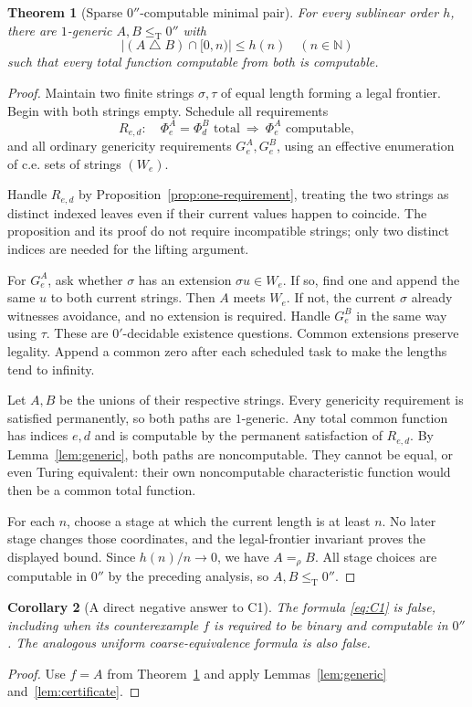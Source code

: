 \documentclass[11pt,a4paper]{article}
\newcommand{\N}{\mathbb N}
\newcommand{\leT}{\leq_{\mathrm T}}
\newtheorem{theorem}{Theorem}[section]
\newtheorem{corollary}[theorem]{Corollary}
\theoremstyle{definition}\newtheorem{definition}[theorem]{Definition}
\theoremstyle{remark}\newtheorem{remark}[theorem]{Remark}
\begin{document}
\begin{theorem}[Sparse $0''$-computable minimal pair]\label{thm:pair}
For every sublinear order $h$, there are $1$-generic $A,B\leT0''$ with
\[
 |(A\mathbin\triangle B)\cap[0,n)|\le h(n)\quad(n\in\N)
\]
such that every total function computable from both is computable.
\end{theorem}
\begin{proof}
Maintain two finite strings $\sigma,\tau$ of equal length forming a legal
frontier. Begin with both strings empty. Schedule all requirements
\[
 R_{e,d}:\quad\Phi_e^A=\Phi_d^B\text{ total}
                       \ \Longrightarrow\ \Phi_e^A\text{ computable},
\]
and all ordinary genericity requirements $G_e^A,G_e^B$, using an effective
enumeration of c.e. sets of strings $(W_e)$.

Handle $R_{e,d}$ by Proposition~\ref{prop:one-requirement}, treating the two
strings as distinct indexed leaves even if their current values happen to
coincide. The proposition and its proof do not require incompatible strings;
only two distinct indices are needed for the lifting argument.

For $G_e^A$, ask whether $\sigma$ has an extension $\sigma u\in W_e$.
If so, find one and append the same $u$ to both current strings. Then $A$
meets $W_e$. If not, the current $\sigma$ already witnesses avoidance, and
no extension is required. Handle $G_e^B$ in the same way using $\tau$.
These are $0'$-decidable existence questions. Common extensions preserve
legality. Append a common zero after each scheduled task to make the lengths
tend to infinity.

Let $A,B$ be the unions of their respective strings. Every genericity
requirement is satisfied permanently, so both paths are $1$-generic. Any
total common function has indices $e,d$ and is computable by the permanent
satisfaction of $R_{e,d}$. By Lemma~\ref{lem:generic}, both paths are
noncomputable. They cannot be equal, or even Turing equivalent: their own
noncomputable characteristic function would then be a common total function.

For each $n$, choose a stage at which the current length is at least $n$.
No later stage changes those coordinates, and the legal-frontier invariant
proves the displayed bound. Since $h(n)/n\to0$, we have $A=_{\rho}B$.
All stage choices are computable in $0''$ by the preceding analysis, so
$A,B\leT0''$.
\end{proof}

\begin{corollary}[A direct negative answer to C1]\label{cor:C1}
The formula \eqref{eq:C1} is false, including when its counterexample $f$ is
required to be binary and computable in $0''$. The analogous uniform
coarse-equivalence formula is also false.
\end{corollary}
\begin{proof}
Use $f=A$ from Theorem~\ref{thm:pair} and apply
Lemmas~\ref{lem:generic} and~\ref{lem:certificate}.
\end{proof}
\end{document}
